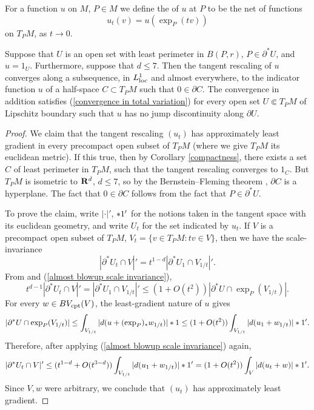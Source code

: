 \begin{definition}
For a function $u$ on $M$, $P \in M$ we define the  of $u$ at $P$ to be the net of functions
$$u_t(v) = u\left(\exp_P(tv)\right)$$
on $T_PM$, as $t \to 0$.
\end{definition}

\begin{proposition}\label{blowup theorem}
Suppose that $U$ is an open set with least perimeter in $B(P, r)$, $P \in \partial^* U$, and $u = 1_U$.
Furthermore, suppose that $d \leq 7$.
Then the tangent rescaling of $u$ converges along a subsequence, in $L^1_{\mathrm{loc}}$ and almost everywhere, to the indicator function $u$ of a half-space $C \subset T_PM$ such that $0 \in \partial C$.
The convergence in addition satisfies (\ref{convergence in total variation}) for every open set $U \Subset T_PM$ of Lipschitz boundary such that $u$ has no jump discontinuity along $\partial U$.
\end{proposition}
\begin{proof}
We claim that the tangent rescaling $(u_t)$ has approximately least gradient in every precompact open subset of $T_PM$ (where we give $T_PM$ its euclidean metric). If this true, then by Corollary \ref{compactness}, there exists a set $C$ of least perimeter in $T_PM$, such that the tangent rescaling converges to $1_C$.
But $T_PM$ is isometric to $\mathbf{R}^d$, $d \leq 7$, so by the Bernstein--Fleming theorem \cite[Theorem 17.3]{Giusti77} \cite[\S5]{Fleming62}, $\partial C$ is a hyperplane.
The fact that $0 \in \partial C$ follows from the fact that $P \in \partial^* U$.

To prove the claim, write $|\cdot|'$, $*1'$ for the notions taken in the tangent space with its euclidean geometry, and write $U_t$ for the set indicated by $u_t$.
If $V$ is a precompact open subset of $T_PM$, $V_t = \{v \in T_PM: tv \in V\}$, then we have the scale-invariance
\begin{equation}\label{almost blowup scale invariance}
|\partial^* U_t \cap V|' = t^{1 - d}|\partial^* U_1 \cap V_{1/t}|'.
\end{equation}
From \cite[Lemma 3.4]{schoen1994lectures} and (\ref{almost blowup scale invariance}),
$$t^{d - 1} |\partial^* U_t \cap V|' = |\partial^* U_1 \cap V_{1/t}|' \leq (1 + O(t^2)) |\partial^* U \cap \exp_P(V_{1/t})|.$$
For every $w \in BV_{\mathrm{cpt}}(V)$, the least-gradient nature of $u$ gives
$$|\partial^* U \cap \exp_P(V_{1/t})| \leq \int_{V_{1/t}} |d(u + (\exp_P)_* w_{1/t})| *1 \leq (1 + O(t^2))\int_{V_{1/t}} |d(u_1 + w_{1/t})| *1'.$$
Therefore, after applying (\ref{almost blowup scale invariance}) again,
$$|\partial^* U_t \cap V|' \leq (t^{1 - d} + O(t^{3 - d})) \int_{V_{1/t}} |d(u_1 + w_{1/t})| *1' = (1 + O(t^2)) \int_V |d(u_t + w)| *1'.$$
Since $V,w$ were arbitrary, we conclude that $(u_t)$ has approximately least gradient.
\end{proof}
